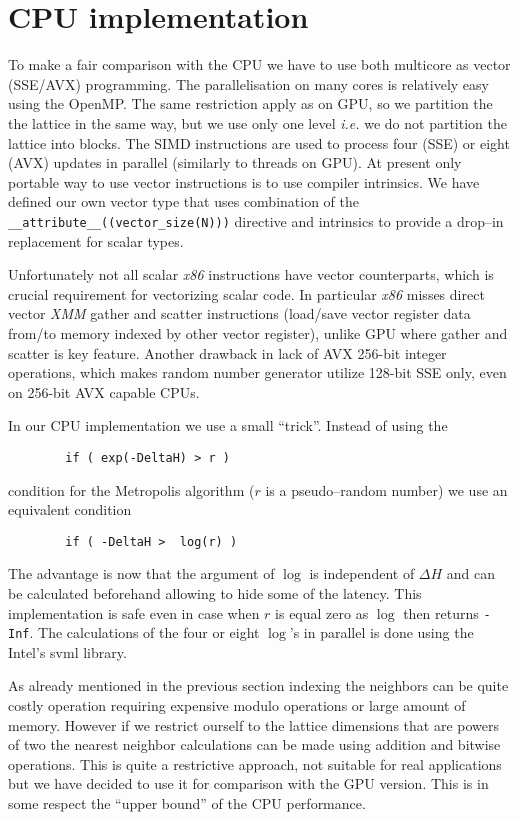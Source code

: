 \documentclass[a4paper]{llncs}
\begin{document}
\section{CPU implementation}
To make a fair comparison with the CPU we have to use both multicore
as vector (SSE/AVX) programming.  The parallelisation on many cores
is relatively easy using the OpenMP. The same restriction apply as on
GPU, so we partition the the lattice in the same way, but we use only
one level {\em i.e.} we do not partition the lattice into blocks.  The
SIMD instructions are used to process four (SSE) or eight (AVX)
updates in parallel (similarly to threads on GPU).  At present only
portable way to use vector instructions is to use compiler
intrinsics\cite{intr}. We have defined our own vector type that uses
combination of the \lstinline!__attribute__((vector_size(N)))!
directive and intrinsics to provide a drop--in replacement for scalar
types.

Unfortunately not all scalar \emph{x86} instructions have vector counterparts,
which is crucial requirement for vectorizing scalar code. In particular
\emph{x86} misses direct vector \emph{XMM} gather and scatter instructions
(load/save vector register data from/to memory indexed by other vector
register), unlike GPU where gather and scatter is key feature. Another drawback
in lack of AVX 256-bit integer operations, which makes random number generator
utilize 128-bit SSE only, even on 256-bit AVX capable CPUs.

In our CPU implementation we use a small ``trick''. Instead of using the
\begin{lstlisting}
        if ( exp(-DeltaH) > r )
\end{lstlisting}
condition for the Metropolis algorithm ($r$ is a pseudo--random number) we use
an equivalent condition
\begin{lstlisting}
        if ( -DeltaH >  log(r) )
\end{lstlisting}

The advantage is now that the argument of $\log$ is independent of
$\Delta H$ and can be calculated beforehand allowing to hide some of
the latency. This implementation is safe even in case when $r$ is
equal zero as $\log$ then returns {\tt -Inf}.  The calculations of the
four or eight $\log$'s in parallel is done using the Intel's svml
library.

As already mentioned in the previous section indexing the neighbors
can be quite costly operation requiring expensive modulo
operations or large amount of memory. However if
we restrict ourself to the lattice dimensions that are powers of two
the nearest neighbor calculations can be made using addition and bitwise
operations. This is quite a restrictive approach, not suitable
for real applications but we have decided to use it for comparison
with the GPU version. This is in some respect the ``upper bound'' of
the CPU performance.
\end{document}
